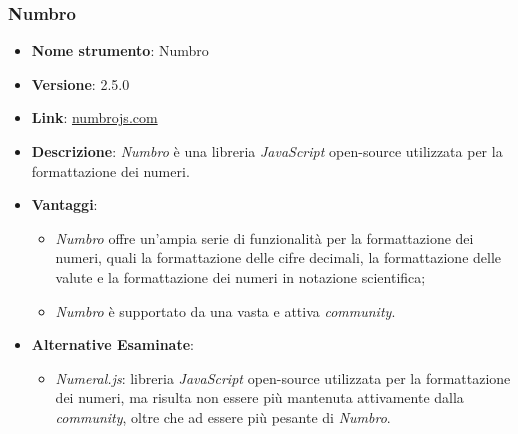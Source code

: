 \subsubsection{Numbro}
\begin{itemize}
    \item \textbf{Nome strumento}: Numbro
    \item \textbf{Versione}: 2.5.0
    \item \textbf{Link}: \href{http://numbrojs.com/}{numbrojs.com}
    \item \textbf{Descrizione}: \textit{Numbro} è una libreria \textit{JavaScript} open-source utilizzata per la formattazione dei numeri.
    \item \textbf{Vantaggi}:
          \begin{itemize}
              \item \textit{Numbro} offre un'ampia serie di funzionalità per la formattazione dei numeri, quali la formattazione delle cifre decimali, la formattazione delle valute
                    e la formattazione dei numeri in notazione scientifica;
              \item \textit{Numbro} è supportato da una vasta e attiva \textit{community}.
          \end{itemize}
    \item \textbf{Alternative Esaminate}:
          \begin{itemize}
              \item \textit{Numeral.js}: libreria \textit{JavaScript} open-source utilizzata per la formattazione dei numeri, ma risulta non essere più mantenuta attivamente dalla \textit{community}, oltre
                    che ad essere più pesante di \textit{Numbro}.
          \end{itemize}
\end{itemize}

